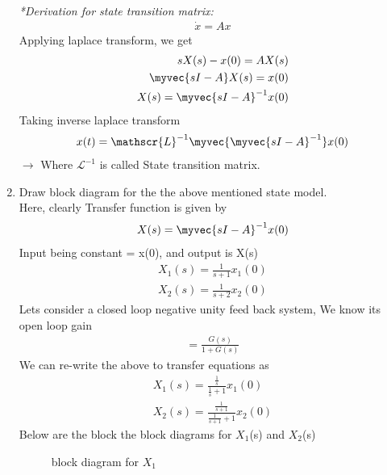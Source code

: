 \begin{enumerate}[label=\thesubsection.\arabic*.,ref=\thesubsection.\theenumi]
\emph{*Derivation for state transition matrix:}
\begin{align}
    \dot{x} =Ax
\end{align} 
Applying laplace transform, we get
\begin{align}
    sX(s) -x(0) = AX(s)\\
    \myvec{sI - A}X(s) = x(0)\\
    X(s) = \myvec{sI - A}^{-1}x(0)\\
\end{align} 
Taking inverse laplace transform
\begin{align}
    x(t) = \mathscr{L}^{-1}\myvec{\myvec{sI -A}^{-1}}x(0)
\end{align}
$\to$ Where $\mathscr{L}^{-1}$ is called State transition matrix.\\
\item Draw block diagram for the the above mentioned state model.\\
\solution Here, clearly Transfer function is given by 
\begin{align}
    X(s) = \myvec{sI - A}^{-1}x(0)
\end{align}
Input being constant = x(0), and output is X(s)\\
\begin{align}
    X_1(s) = \frac{1}{s+1}x_1(0)\\
    X_2(s) = \frac{1}{s+2}x_2(0)
\end{align}
Lets consider a closed loop negative unity feed back system, We know its open loop gain
\begin{align}
    = \frac{G(s)}{1+G(s)}
\end{align}
We can re-write the above to transfer equations as
\begin{align}
    X_1(s) = \frac{\frac{1}{s}}{\frac{1}{s}+1}x_1(0)\\
    X_2(s) = \frac{\frac{1}{s+1}}{\frac{1}{s+1}+1}x_2(0)
\end{align}
Below are the block the block diagrams for $X_1$(s) and $X_2$(s)
\begin{figure}[!ht]
    \begin{center}
		
		\resizebox{\columnwidth}{!}{}
	\end{center}
\caption{block diagram for $X_1$}
\label{fig:block1}
\end{figure}
\begin{figure}[!ht]
    \begin{center}
		

\end{center}
\end{figure}
\end{enumerate}
